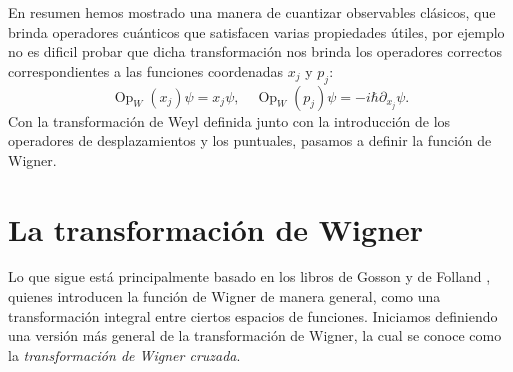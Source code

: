 \documentclass[a4paper]{report}
\DeclareMathOperator{\Op}{Op}
\begin{document}
  En resumen hemos mostrado una manera de cuantizar
  observables clásicos, que brinda operadores cuánticos que
  satisfacen varias propiedades útiles, por ejemplo no es
  dificil probar que dicha transformación nos brinda los
  operadores correctos correspondientes a las funciones
  coordenadas
  $x_j$ y $p_j$:
  \begin{equation}
    \Op_W(x_j)\psi = x_j\psi,
    \quad
    \Op_W(p_j)\psi = -i\hbar \partial_{x_j}\psi.
  \end{equation}
  Con la transformación de Weyl definida junto con la
  introducción de los operadores de desplazamientos y los
  puntuales, pasamos a definir la función de Wigner.

  \section{La transformación de Wigner}

  Lo que sigue está principalmente basado en los libros de
  Gosson \cite{gossonWignerTransform2017} y de Folland
  \cite{follandHarmonicAnalysisPhase1989}, quienes
  introducen la función de Wigner de manera general, como
  una transformación integral entre ciertos espacios de
  funciones. Iniciamos definiendo una versión más general de
  la transformación de Wigner, la cual se conoce como la
  \textit{transformación de Wigner cruzada}. 
\end{document}
